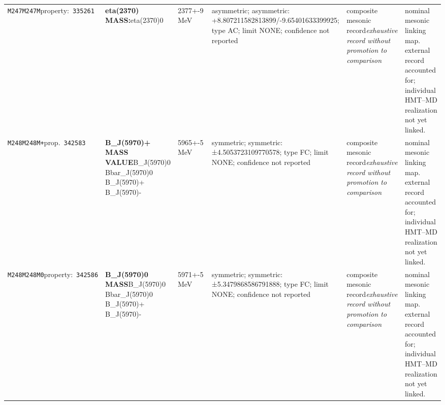 \begin{landscape}
\begin{longtable}{L{1.85cm}L{4.45cm}L{2.35cm}L{4.05cm}L{3.35cm}L{7.15cm}}
\texttt{M247}\newline \texttt{M247M}\newline property:\ \texttt{335261} & \textbf{eta(2370) MASS:}\newline eta(2370)0 & 2377+-9\,MeV & asymmetric; asymmetric: +8.807211582813899/-9.65401633399925; type AC; limit NONE; confidence not reported & composite mesonic record\newline \emph{exhaustive record without promotion to comparison} & nominal mesonic linking map. external record accounted for; individual HMT--MD realization not yet linked. \\
\texttt{M248}\newline \texttt{M248M+}\newline prop.\ \texttt{342583} & \textbf{B\_\allowbreak{}J(5970)+ MASS VALUE}\newline B\_\allowbreak{}J(5970)0 \textbar{}\allowbreak{} Bbar\_\allowbreak{}J(5970)0 \textbar{}\allowbreak{} B\_\allowbreak{}J(5970)+ \textbar{}\allowbreak{} B\_\allowbreak{}J(5970)- & 5965+-5\,MeV & symmetric; symmetric: ±4.5053723109770578; type FC; limit NONE; confidence not reported & composite mesonic record\newline \emph{exhaustive record without promotion to comparison} & nominal mesonic linking map. external record accounted for; individual HMT--MD realization not yet linked. \\
\texttt{M248}\newline \texttt{M248M0}\newline property:\ \texttt{342586} & \textbf{B\_\allowbreak{}J(5970)0 MASS}\newline B\_\allowbreak{}J(5970)0 \textbar{}\allowbreak{} Bbar\_\allowbreak{}J(5970)0 \textbar{}\allowbreak{} B\_\allowbreak{}J(5970)+ \textbar{}\allowbreak{} B\_\allowbreak{}J(5970)- & 5971+-5\,MeV & symmetric; symmetric: ±5.3479868586791888; type FC; limit NONE; confidence not reported & composite mesonic record\newline \emph{exhaustive record without promotion to comparison} & nominal mesonic linking map. external record accounted for; individual HMT--MD realization not yet linked. \\

\end{longtable}
\end{landscape}
